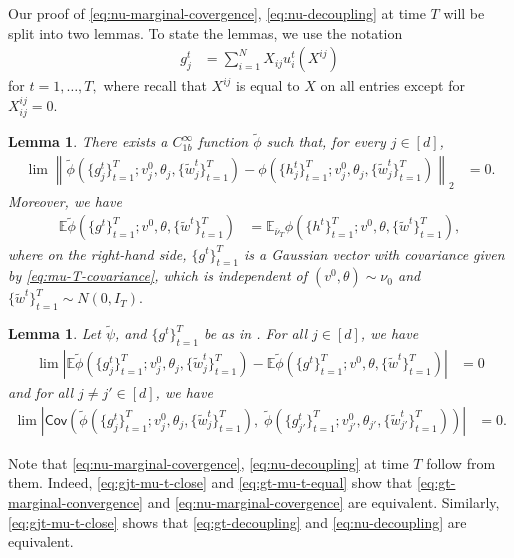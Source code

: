 \documentclass{article}
\newcommand{\1}{\mathbbm{1}}
\newcommand{\norm}[1]{\left\lVert#1\right\rVert}
\theoremstyle{plain}
\newtheorem{lemma}[theorem]{Lemma}
\theoremstyle{definition}
\theoremstyle{remark}
\newcommand{\E}{\mathbb{E}}
\newcommand{\Cov}{\mathsf{Cov}}
\begin{document}
Our proof of \eqref{eq:nu-marginal-covergence}, \eqref{eq:nu-decoupling} at time $T$ will be split into two lemmas. To state the lemmas, we use the notation
    \begin{align*}
        g_j^t &= \sum_{i=1}^N X_{ij}u_i^t(X^{ij})
    \end{align*}
for $t=1,\dots,T,$ where recall that $X^{ij}$ is equal to $X$ on all entries except for $X^{ij}_{ij}=0.$
\begin{lemma}\label{lem:inductive-case-lemma1}
    There exists a $C^\infty_{1b}$ function $\tilde{\phi}$ such that, for every $j\in [d]$,
    \begin{align}
        \lim \norm{\tilde{\phi}( \{g_j^t\}_{t=1}^T;v^0_j,\theta_j,\{\tilde{w}_j^t\}_{t=1}^T) - \phi( \{h_j^t\}_{t=1}^T;v^0_j,\theta_j,\{\tilde{w}_j^t\}_{t=1}^T) }_2 &= 0.\label{eq:gjt-mu-t-close}
    \end{align}
    Moreover, we have 
    \begin{align}
        \E \tilde{\phi}( \{g^t\}_{t=1}^T;v^0,\theta,\{\tilde{w}^t\}_{t=1}^T) &=\E_{\overline{\nu}_T} \phi( \{h^t\}_{t=1}^T;v^0,\theta,\{\tilde{w}^t\}_{t=1}^T),\label{eq:gt-mu-t-equal}
    \end{align}
    where on the right-hand side, $\{g^t\}_{t=1}^T$ is a Gaussian vector with covariance given by \eqref{eq:mu-T-covariance}, which is independent of $(v^0,\theta)\sim \nu_0$ and $\{\tilde{w}^t\}_{t=1}^T\sim N(0, I_T).$
\end{lemma}
\begin{lemma}\label{lem:inductive-case-lemma2}
    Let $\tilde{\psi}$, and $\{g^t\}_{t=1}^T$ be as in .
    For all $j\in [d]$, we have 
        \begin{align}
            \lim |\E \tilde{\phi}( \{g_j^t\}_{t=1}^T;v^0_j,\theta_j,\{\tilde{w}_j^t\}_{t=1}^T) - \E \tilde{\phi}( \{g^t\}_{t=1}^T;v^0,\theta,\{\tilde{w}^t\}_{t=1}^T)| &= 0 \label{eq:gt-marginal-convergence} 
        \end{align}
        and for all $j\neq j'\in [d]$, we have
        \begin{align}
            \lim  \left|\Cov\left(\tilde{\phi}( \{g_j^t\}_{t=1}^T;v^0_j,\theta_j,\{\tilde{w}_j^t\}_{t=1}^T) ,\; \tilde{\phi}( \{g_{j'}^t\}_{t=1}^T;v^0_{j'},\theta_{j'},\{\tilde{w}_{j'}^t\}_{t=1}^T) \right)\right| &= 0. \label{eq:gt-decoupling}
        \end{align}
\end{lemma}
Note that \eqref{eq:nu-marginal-covergence}, \eqref{eq:nu-decoupling} at time $T$ follow from them. Indeed, \eqref{eq:gjt-mu-t-close} and \eqref{eq:gt-mu-t-equal} show that \eqref{eq:gt-marginal-convergence} and \eqref{eq:nu-marginal-covergence} are equivalent. Similarly, \eqref{eq:gjt-mu-t-close} shows that \eqref{eq:gt-decoupling} and \eqref{eq:nu-decoupling} are equivalent.
\end{document}
